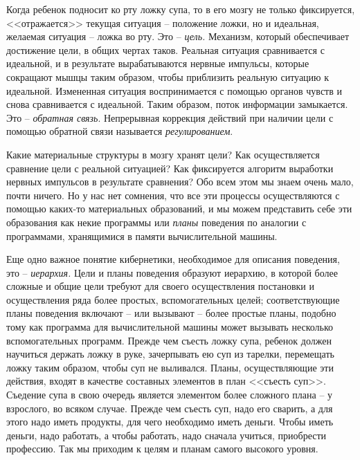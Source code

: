\documentclass{book}
\begin{document}
Когда ребенок подносит ко рту ложку супа, то в его мозгу не только фиксируется, <<отражается>> текущая ситуация -- положение 
ложки, но и идеальная, желаемая ситуация -- ложка во рту. Это -- \textit{цель.}  Механизм, который обеспечивает достижение цели,
в общих чертах таков. Реальная ситуация сравнивается с идеальной, и в результате вырабатываются нервные импульсы, которые
сокращают мышцы таким образом, чтобы приблизить реальную ситуацию к идеальной. Измененная ситуация воспринимается с помощью
органов чувств и снова сравнивается с идеальной. Таким образом, поток информации замыкается. Это -- \textit{обратная связь}.  Непрерывная коррекция действий при наличии цели с помощью обратной связи называется \textit{регулированием}. 

Какие материальные структуры в мозгу хранят цели? Как осуществляется сравнение цели с реальной ситуацией? Как фиксируется 
алгоритм выработки нервных импульсов в результате сравнения? Обо всем этом мы знаем очень мало, почти ничего. Но у нас нет 
сомнения, что все эти процессы осуществляются с помощью каких-то материальных образований, и мы можем представить себе эти 
образования как некие програм­мы или \textit{планы}  поведения%
по аналогии с программами, хра­нящимися в памяти вычислительной машины.

Еще одно важное понятие кибернетики, необходимое для описания поведения, это -- \textit{иерархия.}  Цели и планы поведения образуют 
иерархию, в которой более сложные и общие цели требуют для своего осуществления постановки и осуществле­ния ряда более простых, 
вспомогательных целей; соответству­ющие планы поведения включают -- или вызывают -- более простые планы, подобно тому как 
программа для вычисли­тельной машины может вызывать несколько вспомогательных программ. Прежде чем съесть ложку супа, ребенок 
должен научиться держать ложку в руке, зачерпывать ею суп из тарел­ки, перемещать ложку таким образом, чтобы суп не выливался. 
Планы, осуществляющие эти действия, входят в качестве состав­ных элементов в план <<съесть суп>>. Съедение супа в свою оче­редь 
является элементом более сложного плана -- у взрослого, во всяком случае. Прежде чем съесть суп, надо его сварить, а для этого 
надо иметь продукты, для чего необходимо иметь деньги. Чтобы иметь деньги, надо работать, а чтобы работать, надо сначала 
учиться, приобрести профессию. Так мы приходим к целям и планам самого высокого уровня.
\end{document}
